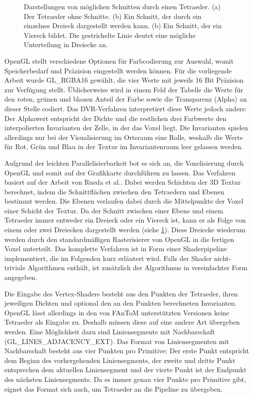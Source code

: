 \documentclass[a4paper,fontsize=12pt,toc=bib,parskip=half,ngerman]{scrartcl}
\begin{document}
\begin{figure}
\begin{subfigure}{0.2\textwidth}
		\caption{}
	\end{subfigure}
	\hspace{0.5cm}
	\caption{Darstellungen von m\"oglichen Schnitten durch einen Tetraeder. (a) Der Tetraeder ohne Schnitte. (b) Ein Schnitt, der durch ein einzelnes Dreieck dargestellt werden kann. (b) Ein Schnitt, der ein Viereck bildet. Die gestrichelte Linie deutet eine m\"ogliche Unterteilung in Dreiecke an.}
	\label{TetraCuts}
\end{figure}

OpenGL stellt verschiedene Optionen f\"ur Farbcodierung zur Auswahl, womit Speicherbedarf und Pr\"azision eingestellt werden k\"onnen. F\"ur die vorliegende Arbeit wurde \glq GL\_RGBA16\grq{} gew\"ahlt, die vier Werte mit jeweils 16 Bit Pr\"azision zur Verf\"ugung stellt. \"Ublicherweise wird in einem Feld der Tabelle die Werte f\"ur den roten, gr\"unen und blauen Anteil der Farbe sowie die Transparenz (\glq Alpha\grq{}) an dieser Stelle codiert. Das DVR-Verfahren interpretiert diese Werte jedoch anders: Der Alphawert entspricht der Dichte und die restlichen drei Farbwerte den interpolierten Invarianten der Zelle, in der das Voxel liegt. Die Invarianten spielen allerdings nur bei der Visualisierung im Ortsraum eine Rolle, weshalb die Werte f\"ur Rot, Gr\"un und Blau in der Textur im Invariantenraum leer gelassen werden.

Aufgrund der leichten Parallelisierbarkeit bot es sich an, die Voxelisierung durch OpenGL und somit auf der Grafikkarte durchf\"uhren zu lassen. Das Verfahren basiert auf der Arbeit von Rueda et al.\cite{rueda2004voxelization}. Dabei werden Schichten der 3D Textur berechnet, indem die Schnittfl\"achen zwischen den Tetraedern und Ebenen bestimmt werden. Die Ebenen verlaufen dabei durch die Mittelpunkte der Voxel einer Schicht der Textur. Da der Schnitt zwischen einer Ebene und einem Tetraeder immer entweder ein Dreieck oder ein Viereck ist, kann er als Folge von einem oder zwei Dreiecken dargestellt werden (siehe \cref{TetraCuts}). Diese Dreiecke wiederum werden durch den standardm\"a{\ss}igen Rasterisierer von OpenGL in die fertigen Voxel unterteilt. Das komplette Verfahren ist in Form einer Shaderpipeline implementiert, die im Folgenden kurz erl\"autert wird. Falls der Shader nicht-triviale Algorithmen enth\"alt, ist zus\"atzlich der Algorithmus in vereinfachter Form angegeben.

Die Eingabe des Vertex-Shaders besteht aus den Punkten der Tetraeder, ihren jeweiligen Dichten und optional den an den Punkten berechneten Invarianten. OpenGL l\"asst allerdings in den von FAnToM unterst\"utzten Versionen keine Tetraeder als Eingabe zu. Deshalb m\"ussen diese auf eine andere Art \"ubergeben werden. Eine M\"oglichkeit dazu sind Liniensegmente mit Nachbarschaft (\glq GL\_LINES\_ADJACENCY\_EXT\grq{}). Das Format von Liniensegmenten mit Nachbarschaft besteht aus vier Punkten pro Primitive: Der erste Punkt entspricht dem Beginn des vorhergehenden Liniensegments, der zweite und dritte Punkt entsprechen dem aktuellen Liniensegment und der vierte Punkt ist der Endpunkt des n\"achsten Liniensegments. Da es immer genau vier Punkte pro Primitive gibt, eignet das Format sich auch, um Tetraeder an die Pipeline zu \"ubergeben.
\end{document}
